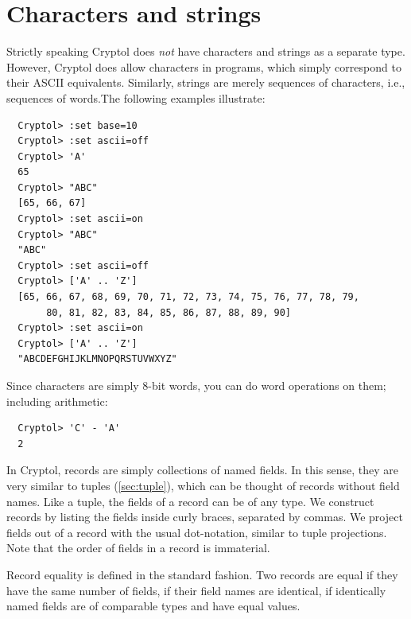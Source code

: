 \section{Characters and strings}
\label{sec:charstring}

Strictly speaking Cryptol does {\em not} have characters and strings
as a separate type. However, Cryptol does allow characters in
programs, which simply correspond to their ASCII
equivalents. Similarly, strings are merely sequences of characters,
i.e., sequences of words.\indTheStringType\indTheCharType The
following examples illustrate:
\begin{Verbatim}
  Cryptol> :set base=10
  Cryptol> :set ascii=off
  Cryptol> 'A'
  65
  Cryptol> "ABC"
  [65, 66, 67]
  Cryptol> :set ascii=on
  Cryptol> "ABC"
  "ABC"
  Cryptol> :set ascii=off
  Cryptol> ['A' .. 'Z']
  [65, 66, 67, 68, 69, 70, 71, 72, 73, 74, 75, 76, 77, 78, 79,
       80, 81, 82, 83, 84, 85, 86, 87, 88, 89, 90]
  Cryptol> :set ascii=on
  Cryptol> ['A' .. 'Z']
  "ABCDEFGHIJKLMNOPQRSTUVWXYZ"
\end{Verbatim}

\noindent Since characters are simply 8-bit words, you can do word
operations on them; including arithmetic:
\begin{Verbatim}
  Cryptol> 'C' - 'A'
  2
\end{Verbatim}


In Cryptol, records are simply collections of named fields. In this
sense, they are very similar to tuples (\autoref{sec:tuple}), which
can be thought of records without field names. Like a tuple, the
fields of a record can be of any type. We construct records by listing
the fields inside curly braces, separated by commas. We project fields
out of a record with the usual dot-notation, similar to tuple
projections. Note that the order of fields in a record is
immaterial.\indTheRecordType\indTheTupleType

Record equality is defined in the standard fashion.  Two records are
equal if they have the same number of fields, if their field names are
identical, if identically named fields are of comparable types and
have equal values.

